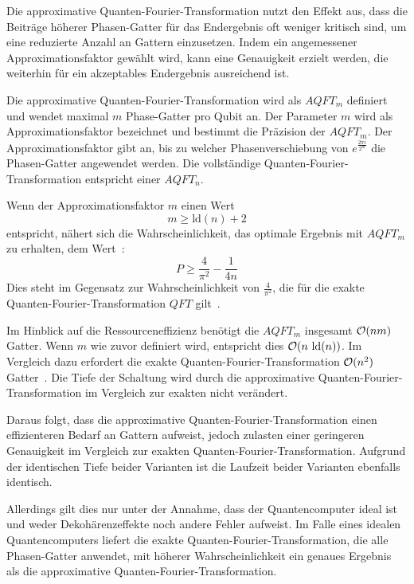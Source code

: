 Die approximative Quanten-Fourier-Transformation nutzt den Effekt aus, 
dass die Beiträge höherer Phasen-Gatter für das Endergebnis oft weniger kritisch sind, 
um eine reduzierte Anzahl an Gattern einzusetzen. 
Indem ein angemessener Approximationsfaktor gewählt wird, 
kann eine Genauigkeit erzielt werden, 
die weiterhin für ein akzeptables Endergebnis ausreichend ist.

Die approximative Quanten-Fourier-Transformation wird als \(AQFT_m\) definiert und 
wendet maximal \(m\) Phase-Gatter pro Qubit an. 
Der Parameter \(m\) wird als Approximationsfaktor bezeichnet und bestimmt die Präzision der \(AQFT_m\). 
Der Approximationsfaktor gibt an, 
bis zu welcher Phasenverschiebung von \(e^{\frac{2\pi i}{2^m}}\) die Phasen-Gatter angewendet werden.
Die vollständige Quanten-Fourier-Transformation entspricht einer \(AQFT_n\).

Wenn der Approximationsfaktor \(m\) einen Wert
\[m \geq \text{ld}(n)+2\]
entspricht, nähert sich die Wahrscheinlichkeit, das optimale Ergebnis mit \(AQFT_m\)
zu erhalten, dem Wert~\cite{cheung2004improved}: 
\[P \geq \frac{4}{\pi^2} - \frac{1}{4n}\]
Dies steht im Gegensatz zur Wahrscheinlichkeit von \(\frac{4}{\pi^2}\), 
die für die exakte Quanten-Fourier-Transformation \(QFT\) gilt~\cite{cheung2004improved}\cite[119]{kaye2007introduction}.

Im Hinblick auf die Ressourceneffizienz benötigt die \(AQFT_m\) insgesamt \(\operatorname{\mathcal{O}}(nm)\) Gatter.
Wenn \(m\) wie zuvor definiert wird, entspricht dies \(\operatorname{\mathcal{O}}(n~\text{ld}(n))\). 
Im Vergleich dazu erfordert die exakte Quanten-Fourier-Transformation \(\operatorname{\mathcal{O}}(n^2)\) Gatter~\cite{Barenco_1996}.
Die Tiefe der Schaltung wird durch die approximative Quanten-Fourier-Transformation im Vergleich zur exakten nicht verändert.

Daraus folgt, dass die approximative Quanten-Fourier-Transformation einen effizienteren Bedarf an Gattern aufweist, 
jedoch zulasten einer geringeren Genauigkeit im Vergleich zur exakten Quanten-Fourier-Transformation.
Aufgrund der identischen Tiefe beider Varianten ist die Laufzeit beider Varianten ebenfalls identisch.

Allerdings gilt dies nur unter der Annahme, 
dass der Quantencomputer ideal ist und weder Dekohärenzeffekte noch andere Fehler aufweist.
Im Falle eines idealen Quantencomputers liefert die exakte Quanten-Fourier-Transformation, die alle Phasen-Gatter anwendet, 
mit höherer Wahrscheinlichkeit ein genaues Ergebnis als die approximative Quanten-Fourier-Transformation.

